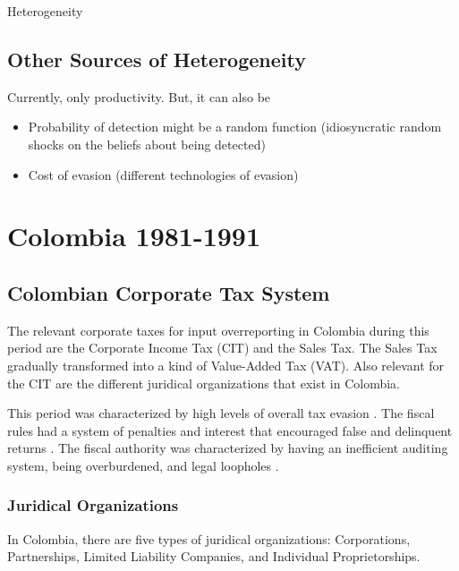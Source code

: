 \documentclass[
  12pt]{article}
\providecommand{\tightlist}{%
  \setlength{\itemsep}{0pt}\setlength{\parskip}{0pt}}\usepackage{longtable,booktabs,array}
\theoremstyle{definition}
\theoremstyle{remark}
\begin{document}
\begin{anfxnote}{Heterogeneity}

\subsection{Other Sources of
Heterogeneity}\label{other-sources-of-heterogeneity}

Currently, only productivity. But, it can also be

\begin{itemize}
\tightlist
\item
  Probability of detection might be a random function (idiosyncratic
  random shocks on the beliefs about being detected)
\item
  Cost of evasion (different technologies of evasion)
\end{itemize}

\end{anfxnote}

\section{Colombia 1981-1991}\label{colombia-1981-1991}

\subsection{Colombian Corporate Tax
System}\label{colombian-corporate-tax-system}

The relevant corporate taxes for input overreporting in Colombia during
this period are the Corporate Income Tax (CIT) and the Sales Tax. The
Sales Tax gradually transformed into a kind of Value-Added Tax (VAT).
Also relevant for the CIT are the different juridical organizations that
exist in Colombia.

This period was characterized by high levels of overall tax evasion
\citep{Sanchez1994}. The fiscal rules had a system of penalties and
interest that encouraged false and delinquent returns
\citep{McLure1989}. The fiscal authority was characterized by having an
inefficient auditing system, being overburdened, and legal loopholes
\citep{Perry1990}.

\subsubsection{Juridical Organizations}\label{juridical-organizations}

In Colombia, there are five types of juridical organizations:
Corporations, Partnerships, Limited Liability Companies, and Individual
Proprietorships.
\end{document}
